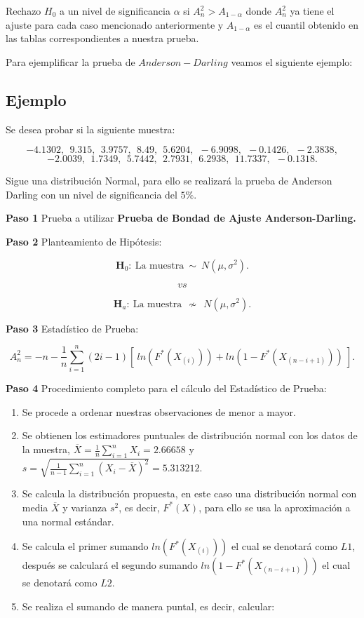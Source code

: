 \documentclass[
  a4paper,
  oneside,
  openany]{book}
\begin{document}
Rechazo \(H_0\) a un nivel de significancia \(\alpha\) si \(A_{n}^2> A_{1-\alpha}\) donde \(A_{n}^{2}\) ya tiene el ajuste para cada caso mencionado anteriormente y \(A_{1-\alpha}\) es el cuantil obtenido en las tablas correspondientes a nuestra prueba.

Para ejemplificar la prueba de \(Anderson-Darling\) veamos el siguiente ejemplo:

\hypertarget{ejemplo-16}{%
\subsection{Ejemplo}\label{ejemplo-16}}

Se desea probar si la siguiente muestra:

\[-4.1302,\ \ 9.315,\ \ 3.9757,\ \ 8.49,\ \ 5.6204,\ \ -6.9098,\ \ -0.1426,\ \ -2.3838,\]
\[-2.0039,\ \ 1.7349,\ \ 5.7442,\ \ 2.7931,\ \ 6.2938,\ \ 11.7337,\ \ -0.1318.\]

Sigue una distribución Normal, para ello se realizará la prueba de Anderson Darling con un nivel de significancia del \(5\%\).

\textbf{Paso 1} Prueba a utilizar \textbf{Prueba de Bondad de Ajuste Anderson-Darling.}

\textbf{Paso 2} Planteamiento de Hipótesis:

\[\textbf{H}_0: \ \mbox{La muestra} \ \sim \  N(\mu,\sigma^2).\]

\[vs\]

\[\textbf{H}_a: \ \mbox{La muestra} \ \ \nsim \ \  N(\mu,\sigma^2).\]

\textbf{Paso 3} Estadístico de Prueba:

\[A_n^2=-n-\frac{1}{n}\sum_{i=1}^{n}\left(2i-1\right)[ \ ln(F^*(X_{(i)})) +ln(1-F^*(X_{(n-i+1)})) \ ].\]

\textbf{Paso 4} Procedimiento completo para el cálculo del Estadístico de Prueba:

\begin{enumerate}
\def\labelenumi{\arabic{enumi})}
\item
  Se procede a ordenar nuestras observaciones de menor a mayor.
\item
  Se obtienen los estimadores puntuales de distribución normal con los datos de la muestra,
  \(\overline{X}=\frac{1}{n}\sum_{i=1}^{n}X_{i}= 2.66658\) y \(s=\sqrt{\frac{1}{n-1}\sum_{i=1}^{n}(X_{i}-\overline{X})^2}=5.313212.\)
\item
  Se calcula la distribución propuesta, en este caso una distribución normal con media \(\overline{X}\) y varianza \(s^2\), es decir, \(F^*(X)\), para ello se usa la aproximación a una normal estándar.
\item
  Se calcula el primer sumando \(ln(F^*(X_{(i)}))\) el cual se denotará como \(L1\), después se calculará el segundo sumando \(ln(1-F^*(X_{(n-i+1)}))\) el cual se denotará como \(L2\).
\item
  Se realiza el sumando de manera puntal, es decir, calcular:
\end{enumerate}
\end{document}
